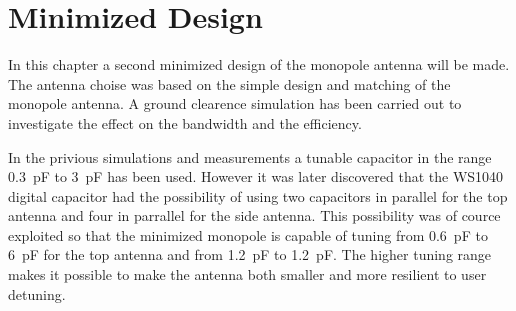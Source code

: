 \chapter{Minimized Design}
\label{cha_intro_5mm}
In this chapter a second minimized design of the monopole antenna will be made.
The antenna choise was based on the simple design and matching of the monopole antenna.
A ground clearence simulation has been carried out to investigate the effect on the bandwidth and the efficiency.

In the privious simulations and measurements a tunable capacitor in the range \SI{0.3}{pF} to \SI{3}{pF} has been used. However it was later discovered that the WS1040 digital capacitor had the possibility of using two capacitors in parallel for the top antenna and four in parrallel for the side antenna. This possibility was of cource exploited so that the minimized monopole is capable of tuning from \SI{0.6}{pF} to \SI{6}{pF} for the top antenna and from \SI{1.2}{pF} to \SI{1.2}{pF}. The higher tuning range makes it possible to make the antenna both smaller and more resilient to user detuning.
